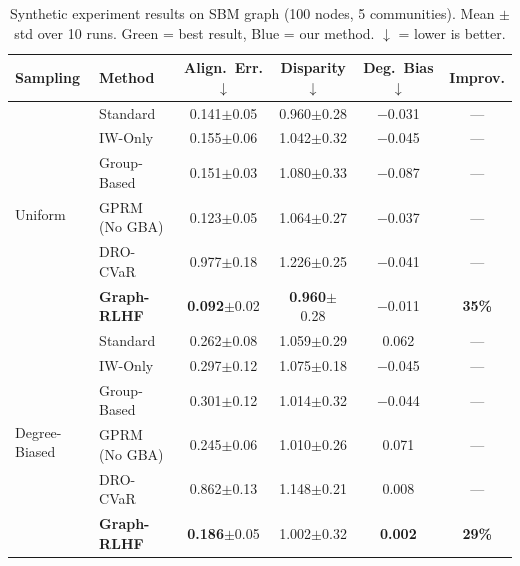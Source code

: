 \documentclass{article}
\theoremstyle{plain}
\theoremstyle{definition}
\theoremstyle{remark}
\begin{document}
\begin{table}[t]
\caption{Synthetic experiment results on SBM graph (100 nodes, 5 communities). Mean $\pm$ std over 10 runs. \colorbox{bestgreen}{Green} = best result, \colorbox{goodblue}{Blue} = our method. $\downarrow$ = lower is better.}
\label{tab:synthetic-results}
\centering
\small
\begin{tabular}{llcccc}
\toprule
\textbf{Sampling} & \textbf{Method} & \textbf{Align.\ Err.}$\downarrow$ & \textbf{Disparity}$\downarrow$ & \textbf{Deg.\ Bias}$\downarrow$ & \textbf{Improv.} \\
\midrule
\multirow{6}{*}{Uniform}
& \cellcolor{neutralgray}Standard & \cellcolor{neutralgray}0.141{\tiny$\pm$0.05} & \cellcolor{neutralgray}0.960{\tiny$\pm$0.28} & \cellcolor{neutralgray}$-$0.031 & \cellcolor{neutralgray}--- \\
& IW-Only & 0.155{\tiny$\pm$0.06} & 1.042{\tiny$\pm$0.32} & $-$0.045 & --- \\
& Group-Based & 0.151{\tiny$\pm$0.03} & 1.080{\tiny$\pm$0.33} & $-$0.087 & --- \\
& GPRM (No GBA) & 0.123{\tiny$\pm$0.05} & 1.064{\tiny$\pm$0.27} & $-$0.037 & --- \\
& DRO-CVaR & 0.977{\tiny$\pm$0.18} & 1.226{\tiny$\pm$0.25} & $-$0.041 & --- \\
& \cellcolor{goodblue}\textbf{Graph-RLHF} & \cellcolor{bestgreen}\textbf{0.092}{\tiny$\pm$0.02} & \cellcolor{bestgreen}\textbf{0.960}{\tiny$\pm$0.28} & \cellcolor{goodblue}$-$0.011 & \cellcolor{bestgreen}\textbf{35\%} \\
\midrule
\multirow{6}{*}{Degree-Biased}
& \cellcolor{neutralgray}Standard & \cellcolor{neutralgray}0.262{\tiny$\pm$0.08} & \cellcolor{neutralgray}1.059{\tiny$\pm$0.29} & \cellcolor{neutralgray}0.062 & \cellcolor{neutralgray}--- \\
& IW-Only & 0.297{\tiny$\pm$0.12} & 1.075{\tiny$\pm$0.18} & $-$0.045 & --- \\
& Group-Based & 0.301{\tiny$\pm$0.12} & 1.014{\tiny$\pm$0.32} & $-$0.044 & --- \\
& GPRM (No GBA) & 0.245{\tiny$\pm$0.06} & 1.010{\tiny$\pm$0.26} & 0.071 & --- \\
& DRO-CVaR & 0.862{\tiny$\pm$0.13} & 1.148{\tiny$\pm$0.21} & 0.008 & --- \\
& \cellcolor{goodblue}\textbf{Graph-RLHF} & \cellcolor{bestgreen}\textbf{0.186}{\tiny$\pm$0.05} & \cellcolor{goodblue}1.002{\tiny$\pm$0.32} & \cellcolor{bestgreen}\textbf{0.002} & \cellcolor{bestgreen}\textbf{29\%} \\

\end{tabular}
\end{table}
\end{document}
